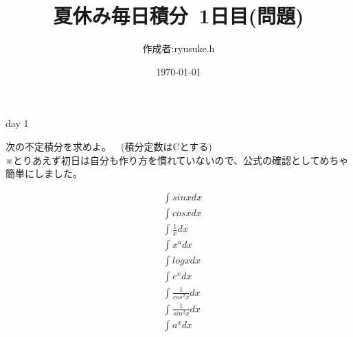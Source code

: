 \documentclass[12pt,a4paper]{jsarticle}
\title{夏休み毎日積分~1日目(問題)}
\date{\today}
\begin{document}
\maketitle
\begin{flushright}
    \author{作成者:ryusuke.h}
\end{flushright}
\begin{itembox}[c]{day 1 }
    \begin{center}
        次の不定積分を求めよ。~~(積分定数はCとする)\\
        ※とりあえず初日は自分も作り方を慣れていないので、公式の確認としてめちゃ簡単にしました。
    \end{center}
\end{itembox}
\begin{align}
    &\int sinx dx \\
    &\int cosx dx \\
    &\int \frac{1}{x} dx \\
    &\int x^a dx \\
    &\int logx dx \\
    &\int e^x dx \\
    &\int \frac{1}{cos^2x} dx \\
    &\int \frac{1}{sin^2x} dx \\
    &\int a^x dx 
\end{align}
\end{document}
